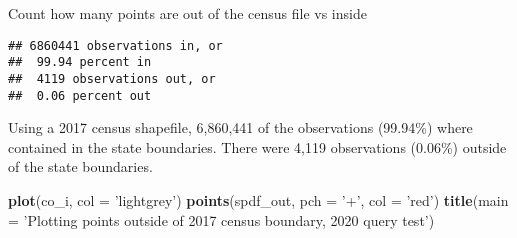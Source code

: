 \documentclass[]{article}
\newenvironment{Shaded}{\begin{snugshade}}{\end{snugshade}}
\newcommand{\CharTok}[1]{\textcolor[rgb]{0.31,0.60,0.02}{#1}}
\newcommand{\DataTypeTok}[1]{\textcolor[rgb]{0.13,0.29,0.53}{#1}}
\newcommand{\DecValTok}[1]{\textcolor[rgb]{0.00,0.00,0.81}{#1}}
\newcommand{\KeywordTok}[1]{\textcolor[rgb]{0.13,0.29,0.53}{\textbf{#1}}}
\newcommand{\NormalTok}[1]{#1}
\newcommand{\OperatorTok}[1]{\textcolor[rgb]{0.81,0.36,0.00}{\textbf{#1}}}
\newcommand{\StringTok}[1]{\textcolor[rgb]{0.31,0.60,0.02}{#1}}
\begin{document}
Count how many points are out of the census file vs inside

\begin{Shaded}
\end{Shaded}

\begin{verbatim}
## 6860441 observations in, or 
##  99.94 percent in 
##  4119 observations out, or 
##  0.06 percent out
\end{verbatim}

Using a 2017 census shapefile, 6,860,441 of the observations (99.94\%)
where contained in the state boundaries. There were 4,119 observations
(0.06\%) outside of the state boundaries.

\begin{Shaded}
\begin{Highlighting}[]
\KeywordTok{plot}\NormalTok{(co_i, }\DataTypeTok{col =} \StringTok{'lightgrey'}\NormalTok{)}
\KeywordTok{points}\NormalTok{(spdf_out, }\DataTypeTok{pch =} \StringTok{'+'}\NormalTok{, }\DataTypeTok{col =} \StringTok{'red'}\NormalTok{)}
\KeywordTok{title}\NormalTok{(}\DataTypeTok{main =} \StringTok{'Plotting points outside of 2017 census boundary, 2020 query test'}\NormalTok{)}
\end{Highlighting}
\end{Shaded}
\end{document}

